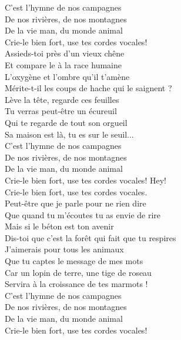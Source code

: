 \documentclass{novel}
\begin{document}
\begin{multicols}{2}
C'est l'hymne de nos campagnes \\
De nos rivières, de nos montagnes \\
De la vie man, du monde animal \\
Crie-le bien fort, use tes cordes vocales! \\

Assieds-toi près d'un vieux chêne \\
Et compare le à la race humaine \\
L'oxygène et l'ombre qu'il t'amène \\
Mérite-t-il les coups de hache qui le saignent ? \\
Lève la tête, regarde ces feuilles \\
Tu verras peut-être un écureuil \\
Qui te regarde de tout son orgueil \\
Sa maison est là, tu es sur le seuil... \\

C'est l'hymne de nos campagnes \\
De nos rivières, de nos montagnes \\
De la vie man, du monde animal \\
Crie-le bien fort, use tes cordes vocales! Hey! \\
Crie-le bien fort, use tes cordes vocales. \\

Peut-être que je parle pour ne rien dire \\
Que quand tu m'écoutes tu as envie de rire \\
Mais si le béton est ton avenir \\
Dis-toi que c'est la forêt qui fait que tu respires \\
J'aimerais pour tous les animaux \\
Que tu captes le message de mes mots \\
Car un lopin de terre, une tige de roseau \\
Servira à la croissance de tes marmots ! \\

C'est l'hymne de nos campagnes \\
De nos rivières, de nos montagnes \\
De la vie man, du monde animal \\
Crie-le bien fort, use tes cordes vocales! \\
\end{multicols}
\end{document}
